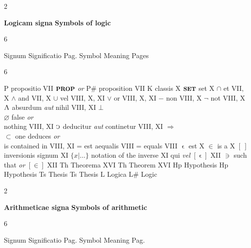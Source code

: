 \documentclass{book}
\newcommand{\s}{\switchcolumn} %
\newcommand{\C}{\mathop{\sbox0{$\displaystyle$$\reflectbox{C}$} %
\raisebox{-\height+\ht0-0.05cm}[\ht0][\dp0]{\scalebox{0.8}[0.8]{\copy0}}}\displaylimits} %
\newcommand{\abs}{\mathop{\rotatebox[origin=c]{180}{V}}}
\newcommand{\such}{\thinspace \rotatebox[origin=c]{180}{$\epsilon$}}
\newcommand{\smallIn}{\ensuremath{\mathrel{\epsilon}}}
\newcommand{\setOfSets}{\mathop{\text{{\footnotesize \textbf{SET}}}}}
\newcommand{\prop}{\mathord{\text{{\footnotesize \textbf{PROP}}}}}
\renewcommand{\rightarrow}{\Rightarrow}
\newenvironment{translateTwoCol}
               { %
                 \columnratio{0.5, 0.5}
                 \begin{paracol}{2}
                 \newcommand{\LAT}{\switchcolumn[0]*}
                 \newcommand{\ENG}{\switchcolumn[1]}
               }
               { %
                 \let\ENG\undefined
                 \let\LAT\undefined
                 \end{paracol}
               }
\newenvironment{translateSixCol}[6]
               { %
                 \setcolumnwidth{#1\fill/1em, #2\fill/1em, #3\fill/\columnsep, #4\fill/1em, #5\fill/1em, #6\fill}
                 \begin{paracol}{6}
                 \newcommand{\LAT}{\switchcolumn[0]*}
                 \newcommand{\ENG}{\switchcolumn[3]}
               }
               { %
                 \let\ENG\undefined
                 \let\LAT\undefined
                 \end{paracol}
               }
\begin{document}
\begin{translateTwoCol}
\centering
\textbf{Logicam signa}
\ENG
\textbf{Symbols of logic}
\end{translateTwoCol}

\begin{translateSixCol}{0.05}{0.35}{0.1}{0.05}{0.35}{0.1}
\raggedright
Signum \s Significatio \s Pag.
\s Symbol \s Meaning \s Pages
\end{translateSixCol}

\begin{translateSixCol}{0.06}{0.34}{0.1}{0.06}{0.34}{0.1}
\raggedright
P \s propositio \s VII
\s $\prop$ \emph{or} P\# \s proposition \s VII
\s* $\text{K}$ \s classis \s X
\s $\setOfSets$ \s set \s X
\s* $\cap$ \s et \s VII, X
\s $\wedge$ \s and \s VII, X
\s* $\cup$ \s vel \s VIII, X, XI
\s $\vee$ \s or \s VIII, X, XI
\s* $-$ \s non \s VIII, X
\s $\neg$ \s not \s VIII, X
\s* $\abs$ \s absurdum \emph{aut} nihil \s VIII, XI
\s $\bot$ \\ $\varnothing$ \s false \emph{or} \\ \quad nothing \s VIII, XI
\s* $\C$ \s deducitur \emph{aut} continetur \s VIII, XI
\s $\rightarrow$ \\ $\subset$ \s one deduces \emph{or} \\ \quad is contained in \s VIII, XI
\s* = \s est aequalis \s VIII
\s = \s equals \s VIII
\s* $\smallIn$ \s est \s X
\s $\in$ \s is a \s X   %
\s* $[ \ ]$ \s inversionis signum \s XI
\s $\{ x | \ldots \}$ \s notation of the inverse \s XI  %
\s* \such \s qui \emph{vel} $[ \smallIn ]$ \s XII
\s $\ni$ \s such that \emph{or} $[ \in ]$ \s XII
\s* Th \s Theorema \s XVI
\s  Th \s Theorem \s XVI
\s* Hp \s Hypothesis \s
\s  Hp \s Hypothesis \s
\s* Ts \s Thesis \s
\s  Ts \s Thesis \s
\s* L \s Logica \s
\s  L\# \s Logic \s
\end{translateSixCol}

\vspace{1em}
\begin{translateTwoCol}
\centering
\textbf{Arithmeticae signa}
\ENG
\textbf{Symbols of arithmetic}
\end{translateTwoCol}

\begin{translateSixCol}{0.05}{0.35}{0.1}{0.05}{0.35}{0.1}
\raggedright
Signum \s Significatio \s Pag.
\s Symbol \s Meaning \s Pag.
\end{translateSixCol}
\end{document}
